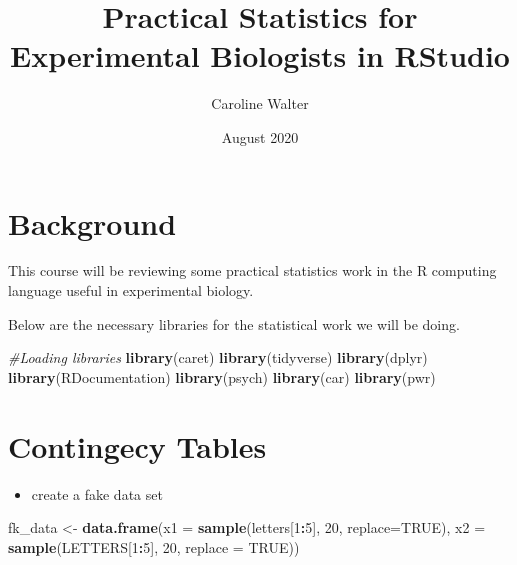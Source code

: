 \documentclass[]{article}
\title{Practical Statistics for Experimental Biologists in RStudio}
\author{Caroline Walter}
\date{August 2020}
\newenvironment{Shaded}{\begin{snugshade}}{\end{snugshade}}
\newcommand{\CommentTok}[1]{\textcolor[rgb]{0.56,0.35,0.01}{\textit{#1}}}
\newcommand{\DataTypeTok}[1]{\textcolor[rgb]{0.13,0.29,0.53}{#1}}
\newcommand{\DecValTok}[1]{\textcolor[rgb]{0.00,0.00,0.81}{#1}}
\newcommand{\KeywordTok}[1]{\textcolor[rgb]{0.13,0.29,0.53}{\textbf{#1}}}
\newcommand{\NormalTok}[1]{#1}
\newcommand{\OperatorTok}[1]{\textcolor[rgb]{0.81,0.36,0.00}{\textbf{#1}}}
\newcommand{\OtherTok}[1]{\textcolor[rgb]{0.56,0.35,0.01}{#1}}
\newcommand{\StringTok}[1]{\textcolor[rgb]{0.31,0.60,0.02}{#1}}
\providecommand{\tightlist}{%
  \setlength{\itemsep}{0pt}\setlength{\parskip}{0pt}}
\begin{document}
\maketitle

{
\setcounter{tocdepth}{3}
\tableofcontents
}
\hypertarget{background}{%
\section{Background}\label{background}}

This course will be reviewing some practical statistics work in the R
computing language useful in experimental biology.

Below are the necessary libraries for the statistical work we will be
doing.

\begin{Shaded}
\begin{Highlighting}[]
\CommentTok{#Loading libraries}
\KeywordTok{library}\NormalTok{(caret)}
\KeywordTok{library}\NormalTok{(tidyverse)}
\KeywordTok{library}\NormalTok{(dplyr)}
\KeywordTok{library}\NormalTok{(RDocumentation)}
\KeywordTok{library}\NormalTok{(psych)}
\KeywordTok{library}\NormalTok{(car)}
\KeywordTok{library}\NormalTok{(pwr)}
\end{Highlighting}
\end{Shaded}

\hypertarget{contingecy-tables}{%
\section{Contingecy Tables}\label{contingecy-tables}}

\begin{itemize}
\tightlist
\item
  create a fake data set
\end{itemize}

\begin{Shaded}
\begin{Highlighting}[]
\NormalTok{fk_data <-}\StringTok{ }\KeywordTok{data.frame}\NormalTok{(}\DataTypeTok{x1 =} \KeywordTok{sample}\NormalTok{(letters[}\DecValTok{1}\OperatorTok{:}\DecValTok{5}\NormalTok{], }\DecValTok{20}\NormalTok{, }\DataTypeTok{replace=}\OtherTok{TRUE}\NormalTok{), }
                      \DataTypeTok{x2 =} \KeywordTok{sample}\NormalTok{(LETTERS[}\DecValTok{1}\OperatorTok{:}\DecValTok{5}\NormalTok{], }\DecValTok{20}\NormalTok{, }\DataTypeTok{replace =} \OtherTok{TRUE}\NormalTok{))}
\end{Highlighting}
\end{Shaded}
\end{document}
